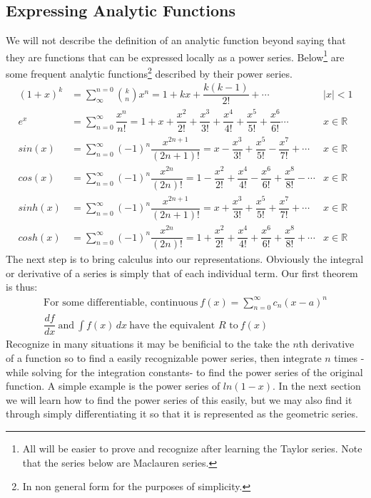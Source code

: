 \documentclass[11pt]{scrreprt}
\newcommand{\abs}[1]{\left| #1 \right|}
\newcommand{\inreal}{\in\mathbb{R}}
\begin{document}
	\subsection*{Expressing Analytic Functions}
		We will not describe the definition of an analytic function beyond saying that they are functions that can be expressed locally as
		a power series. Below\footnote{All  will be easier to prove and recognize after learning the Taylor series. Note that 
		the series below are Maclauren series.} are some frequent analytic functions\footnote{In non general form for the purposes of simplicity.} 
		described by their power series.
			\begin{align}
				(1 + x)^k &= \sum^{n = 0}_{\infty} \binom{k}{n} x^n = 1 + kx + \dfrac{k(k-1)}{2!} + \cdots
					& \abs{x} < 1\\
				e^x &= \sum_{n = 0}^{\infty} \dfrac{x^n}{n!} = 1 + x + \dfrac{x^2}{2!} + \dfrac{x^3}{3!} + \dfrac{x^4}{4!} 
				+ \dfrac{x^5}{5!} + \dfrac{x^6}{6!}\cdots 
					&  x\inreal\\
				sin(x) &= \sum_{n = 0}^{\infty} (-1)^n \dfrac{x^{2n+1}}{(2n+1)!} = x - \dfrac{x^3}{3!} + \dfrac{x^5}{5!} - \dfrac{x^7}{7!} + \cdots
					& x\inreal \\
				cos(x) &= \sum_{n = 0}^{\infty} (-1)^n \dfrac{x^{2n}}{(2n)!} = 1 - \dfrac{x^2}{2!} + \dfrac{x^4}{4!} - \dfrac{x^6}{6!} 
				+ \dfrac{x^8}{8!} - \cdots
					& x\inreal \\
				sinh(x) &= \sum_{n = 0}^{\infty} (-1)^n \dfrac{x^{2n+1}}{(2n+1)!} = x + \dfrac{x^3}{3!} + \dfrac{x^5}{5!} + \dfrac{x^7}{7!} + \cdots
					& x\inreal \\
				cosh(x) &= \sum_{n = 0}^{\infty} (-1)^n \dfrac{x^{2n}}{(2n)!} = 1 + \dfrac{x^2}{2!} + \dfrac{x^4}{4!} + \dfrac{x^6}{6!} 
				+ \dfrac{x^8}{8!} + \cdots
					& x\inreal
			\end{align}
		The next step is to bring calculus into our representations. Obviously the integral or derivative of a series is simply that of
		each individual term. Our first theorem is thus:
			\begin{gather}
				\text{For some differentiable, continuous} \ f(x) = \sum_{n = 0}^{\infty} c_n (x - a)^n \\
				\dfrac{df}{dx} \ \text{and} \ \int f(x) \, dx \ \text{have the equivalent $R$ to} \ f(x)
			\end{gather}
		Recognize in many situations it may be benificial to the take the $n$th derivative of a function so to find a easily recognizable
		power series, then integrate $n$ times -while solving for the integration constants- to find the power series of the original function.
		A simple example is the power series of $ln(1-x)$. In the next section we will learn how to find the power series of this easily, but we 
		may also find it through simply differentiating it so that it is represented as the geometric series.
\end{document}
